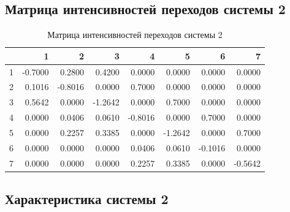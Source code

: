 \documentclass{article}
\begin{document}
\subsection*{Матрица интенсивностей переходов системы 2}
\begin{table}[H]
    \centering
    \begin{tabular}{c|rrrrrrr}
        & 1 & 2 & 3 & 4 & 5 & 6 & 7 \\
        \hline
        1 & -0.7000 & 0.2800 & 0.4200 & 0.0000 & 0.0000 & 0.0000 & 0.0000 \\
        2 & 0.1016 & -0.8016 & 0.0000 & 0.7000 & 0.0000 & 0.0000 & 0.0000 \\
        3 & 0.5642 & 0.0000 & -1.2642 & 0.0000 & 0.7000 & 0.0000 & 0.0000 \\
        4 & 0.0000 & 0.0406 & 0.0610 & -0.8016 & 0.0000 & 0.7000 & 0.0000 \\
        5 & 0.0000 & 0.2257 & 0.3385 & 0.0000 & -1.2642 & 0.0000 & 0.7000 \\
        6 & 0.0000 & 0.0000 & 0.0000 & 0.0406 & 0.0610 & -0.1016 & 0.0000 \\
        7 & 0.0000 & 0.0000 & 0.0000 & 0.2257 & 0.3385 & 0.0000 & -0.5642
    \end{tabular}
    \caption{Матрица интенсивностей переходов системы 2}
    \label{tab:intensity_matrix_2}
\end{table}

\subsection*{Характеристика системы 2}
\end{document}
